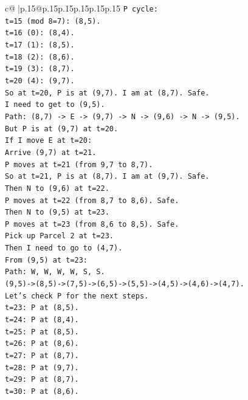 \documentclass{article}
\begin{document}
{\begin{supertabular}{c@{$\;$}|p{.15\linewidth}@{}p{.15\linewidth}p{.15\linewidth}p{.15\linewidth}p{.15\linewidth}p{.15\linewidth}}
{{{\texttt{P cycle:} \\
\texttt{t=15 (mod 8=7): (8,5).} \\
\texttt{t=16 (0): (8,4).} \\
\texttt{t=17 (1): (8,5).} \\
\texttt{t=18 (2): (8,6).} \\
\texttt{t=19 (3): (8,7).} \\
\texttt{t=20 (4): (9,7).} \\
\texttt{So at t=20, P is at (9,7). I am at (8,7). Safe.} \\
\texttt{I need to get to (9,5).} \\
\texttt{Path: (8,7) {-}> E {-}> (9,7) {-}> N {-}> (9,6) {-}> N {-}> (9,5).} \\
\texttt{But P is at (9,7) at t=20.} \\
\texttt{If I move E at t=20:} \\
\texttt{Arrive (9,7) at t=21.} \\
\texttt{P moves at t=21 (from 9,7 to 8,7).} \\
\texttt{So at t=21, P is at (8,7). I am at (9,7). Safe.} \\
\texttt{Then N to (9,6) at t=22.} \\
\texttt{P moves at t=22 (from 8,7 to 8,6). Safe.} \\
\texttt{Then N to (9,5) at t=23.} \\
\texttt{P moves at t=23 (from 8,6 to 8,5). Safe.} \\
\texttt{Pick up Parcel 2 at t=23.} \\
\texttt{Then I need to go to (4,7).} \\
\texttt{From (9,5) at t=23:} \\
\texttt{Path: W, W, W, W, S, S.} \\
\texttt{(9,5){-}>(8,5){-}>(7,5){-}>(6,5){-}>(5,5){-}>(4,5){-}>(4,6){-}>(4,7).} \\
\texttt{Let's check P for the next steps.} \\
\texttt{t=23: P at (8,5).} \\
\texttt{t=24: P at (8,4).} \\
\texttt{t=25: P at (8,5).} \\
\texttt{t=26: P at (8,6).} \\
\texttt{t=27: P at (8,7).} \\
\texttt{t=28: P at (9,7).} \\
\texttt{t=29: P at (8,7).} \\
\texttt{t=30: P at (8,6).} \\
}}}
\end{supertabular}}
\end{document}
